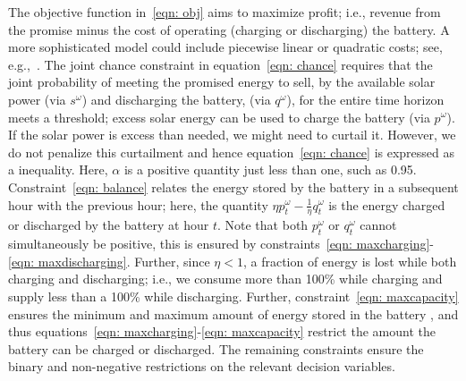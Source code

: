 The objective function in~\eqref{eqn: obj} aims to maximize profit; i.e., revenue from the promise minus the cost of operating (charging or discharging) the battery. A more sophisticated model could include piecewise linear or quadratic costs; see, e.g.,~\cite{carrion2006,wu2011tighter}. The joint chance constraint in equation~\eqref{eqn: chance} requires that the
joint probability of meeting the promised energy to sell, by the available solar power (via $s^\omega$) and discharging the battery, (via $q^\omega$),  for the entire time horizon meets a threshold; excess solar energy can be used to charge the battery (via $p^\omega$). If the solar power is excess than needed, we might need to curtail it. However, we do not penalize this curtailment and hence equation~\eqref{eqn: chance} is expressed as a inequality.  Here, $\alpha$ is a positive quantity just less than one, such as 0.95. Constraint~\eqref{eqn: balance} relates the energy stored by the battery in a subsequent hour with the previous hour; here, the quantity $\eta p_t^\omega - \frac{1}{\eta} q_t^\omega$ is the energy charged or discharged by the battery at hour $t$. Note that both $p_t^\omega$ or $q_t^\omega$ cannot simultaneously be positive, this is ensured by constraints~\eqref{eqn: maxcharging}-\eqref{eqn: maxdischarging}. Further, since $\eta <1$, a fraction of energy is lost while both charging and discharging; i.e., we consume more than 100\% while charging and supply less than a 100\% while discharging. Further, constraint~\eqref{eqn: maxcapacity} ensures the minimum and maximum amount of energy stored in the battery , and thus equations~\eqref{eqn: maxcharging}-\eqref{eqn: maxcapacity} restrict the amount the battery can be charged or discharged.  The remaining constraints ensure the binary and non-negative restrictions on the relevant decision variables. 

